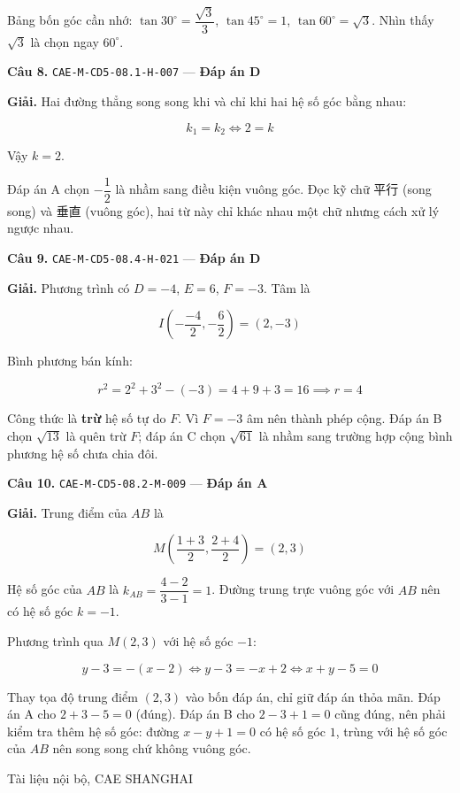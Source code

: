 \documentclass[11pt, a4paper]{article}
\begin{document}
 Bảng bốn góc cần nhớ: $\tan 30^\circ = \dfrac{\sqrt{3}}{3}$, $\tan 45^\circ = 1$, $\tan 60^\circ = \sqrt{3}$. Nhìn thấy $\sqrt{3}$ là chọn ngay $60^\circ$.

\textbf{Câu 8.} \texttt{CAE-M-CD5-08.1-H-007} — \textbf{Đáp án D}

\textbf{Giải.} Hai đường thẳng song song khi và chỉ khi hai hệ số góc bằng nhau:

$$k_1 = k_2 \iff 2 = k$$

Vậy $k = 2$.

 Đáp án A chọn $-\dfrac{1}{2}$ là nhầm sang điều kiện vuông góc. Đọc kỹ chữ 平行 (song song) và 垂直 (vuông góc), hai từ này chỉ khác nhau một chữ nhưng cách xử lý ngược nhau.

\textbf{Câu 9.} \texttt{CAE-M-CD5-08.4-H-021} — \textbf{Đáp án D}

\textbf{Giải.} Phương trình có $D = -4$, $E = 6$, $F = -3$. Tâm là

$$I\left(-\frac{-4}{2}, -\frac{6}{2}\right) = (2, -3)$$

Bình phương bán kính:

$$r^2 = 2^2 + 3^2 - (-3) = 4 + 9 + 3 = 16 \implies r = 4$$

 Công thức là \textbf{trừ} hệ số tự do $F$. Vì $F = -3$ âm nên thành phép cộng. Đáp án B chọn $\sqrt{13}$ là quên trừ $F$; đáp án C chọn $\sqrt{61}$ là nhầm sang trường hợp cộng bình phương hệ số chưa chia đôi.

\textbf{Câu 10.} \texttt{CAE-M-CD5-08.2-M-009} — \textbf{Đáp án A}

\textbf{Giải.} Trung điểm của $AB$ là

$$M\left(\frac{1+3}{2}, \frac{2+4}{2}\right) = (2, 3)$$

Hệ số góc của $AB$ là $k_{AB} = \dfrac{4-2}{3-1} = 1$. Đường trung trực vuông góc với $AB$ nên có hệ số góc $k = -1$.

Phương trình qua $M(2, 3)$ với hệ số góc $-1$:

$$y - 3 = -(x - 2) \iff y - 3 = -x + 2 \iff x + y - 5 = 0$$

 Thay tọa độ trung điểm $(2,3)$ vào bốn đáp án, chỉ giữ đáp án thỏa mãn. Đáp án A cho $2 + 3 - 5 = 0$ (đúng). Đáp án B cho $2 - 3 + 1 = 0$ cũng đúng, nên phải kiểm tra thêm hệ số góc: đường $x - y + 1 = 0$ có hệ số góc $1$, trùng với hệ số góc của $AB$ nên song song chứ không vuông góc.
\vspace{0.8cm}
\begin{center}
{\footnotesize\color{cae_blue} Tài liệu nội bộ, CAE SHANGHAI}
\end{center}
\end{document}

